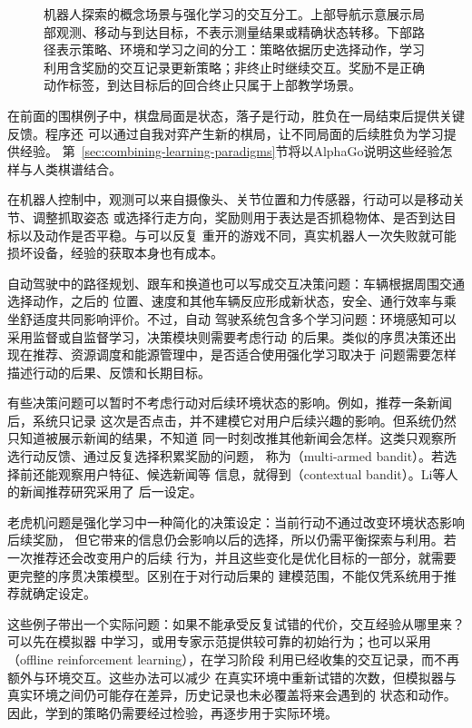\begin{figure}[t]
  \centering
  
  \caption{机器人探索的概念场景与强化学习的交互分工。上部导航示意展示局部观测、移动与到达目标，不表示测量结果或精确状态转移。下部路径表示策略、环境和学习之间的分工：策略依据历史选择动作，学习利用含奖励的交互记录更新策略；非终止时继续交互。奖励不是正确动作标签，到达目标后的回合终止只属于上部教学场景。}
  \label{fig:reinforcement-atari-process}
\end{figure}

在前面的围棋例子中，棋盘局面是状态，落子是行动，胜负在一局结束后提供关键反馈。程序还
可以通过自我对弈产生新的棋局，让不同局面的后续胜负为学习提供经验。
第~\ref{sec:combining-learning-paradigms}节将以AlphaGo说明这些经验怎样与人类棋谱结合。

在机器人控制中，观测可以来自摄像头、关节位置和力传感器，行动可以是移动关节、调整抓取姿态
或选择行走方向，奖励则用于表达是否抓稳物体、是否到达目标以及动作是否平稳。与可以反复
重开的游戏不同，真实机器人一次失败就可能损坏设备，经验的获取本身也有成本。

自动驾驶中的路径规划、跟车和换道也可以写成交互决策问题：车辆根据周围交通选择动作，之后的
位置、速度和其他车辆反应形成新状态，安全、通行效率与乘坐舒适度共同影响评价。不过，自动
驾驶系统包含多个学习问题：环境感知可以采用监督或自监督学习，决策模块则需要考虑行动
的后果。类似的序贯决策还出现在推荐、资源调度和能源管理中，是否适合使用强化学习取决于
问题需要怎样描述行动的后果、反馈和长期目标。

有些决策问题可以暂时不考虑行动对后续环境状态的影响。例如，推荐一条新闻后，系统只记录
这次是否点击，并不建模它对用户后续兴趣的影响。但系统仍然只知道被展示新闻的结果，不知道
同一时刻改推其他新闻会怎样。这类只观察所选行动反馈、通过反复选择积累奖励的问题，
称为（multi-armed bandit）。若选择前还能观察用户特征、候选新闻等
信息，就得到（contextual bandit）。Li等人的新闻推荐研究采用了
后一设定。

老虎机问题是强化学习中一种简化的决策设定：当前行动不通过改变环境状态影响后续奖励，
但它带来的信息仍会影响以后的选择，所以仍需平衡探索与利用。若一次推荐还会改变用户的后续
行为，并且这些变化是优化目标的一部分，就需要更完整的序贯决策模型。区别在于对行动后果的
建模范围，不能仅凭系统用于推荐就确定设定。

这些例子带出一个实际问题：如果不能承受反复试错的代价，交互经验从哪里来？可以先在模拟器
中学习，或用专家示范提供较可靠的初始行为；也可以采用
（offline reinforcement learning），在学习阶段
利用已经收集的交互记录，而不再额外与环境交互。这些办法可以减少
在真实环境中重新试错的次数，但模拟器与真实环境之间仍可能存在差异，历史记录也未必覆盖将来会遇到的
状态和动作。因此，学到的策略仍需要经过检验，再逐步用于实际环境。

